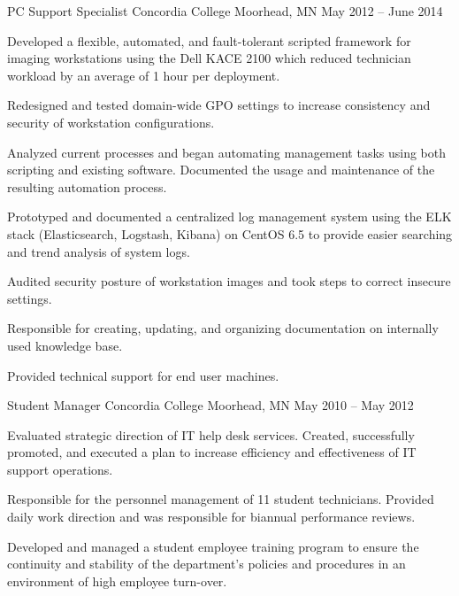 \cventry
	{PC Support Specialist} %
	{Concordia College} %
	{Moorhead, MN} %
	{May 2012 – June 2014} %
	{
	  	\begin{cvitems} %
	        \item {Developed a flexible, automated, and fault-tolerant scripted framework for imaging workstations using the Dell KACE 2100 which reduced technician workload by an average of 1 hour per deployment.}
			\item {Redesigned and tested domain-wide GPO settings to increase consistency and security of workstation configurations.}
			\item {Analyzed current processes and began automating management tasks using both scripting and existing software. Documented the usage and maintenance of the resulting automation process.}
			\item {Prototyped and documented a centralized log management system using the ELK stack (Elasticsearch, Logstash, Kibana) on CentOS 6.5 to provide easier searching and trend analysis of system logs.}
			\item {Audited security posture of workstation images and took steps to correct insecure settings.}
			\item {Responsible for creating, updating, and organizing documentation on internally used knowledge base.}
			\item {Provided technical support for end user machines.}
		\end{cvitems}
	}

\cventry
	{Student Manager} %
	{Concordia College} %
	{Moorhead, MN} %
	{May 2010 – May 2012} %
	{
	  	\begin{cvitems} %
	        \item {Evaluated strategic direction of IT help desk services.  Created, successfully promoted, and executed a plan to increase efficiency and effectiveness of IT support operations.}
			\item {Responsible for the personnel management of 11 student technicians.  Provided daily work direction and was responsible for biannual performance reviews.}
			\item {Developed and managed a student employee training program to ensure the continuity and stability of the department’s policies and procedures in an environment of high employee turn-over.}
		\end{cvitems}
	}

